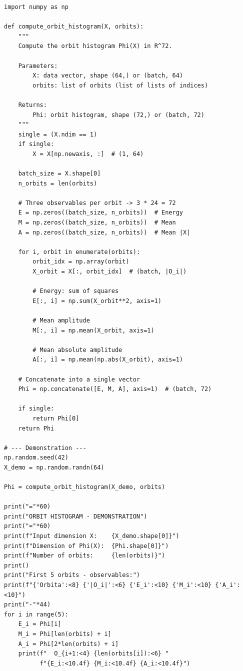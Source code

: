 \documentclass[11pt,a4paper]{report}
\begin{document}
\label{app:ch2-lst2}
\begin{lstlisting}[caption={Implementation of the orbit histogram $\Phi(X)$}]
import numpy as np

def compute_orbit_histogram(X, orbits):
    """
    Compute the orbit histogram Phi(X) in R^72.
    
    Parameters:
        X: data vector, shape (64,) or (batch, 64)
        orbits: list of orbits (list of lists of indices)
    
    Returns:
        Phi: orbit histogram, shape (72,) or (batch, 72)
    """
    single = (X.ndim == 1)
    if single:
        X = X[np.newaxis, :]  # (1, 64)
    
    batch_size = X.shape[0]
    n_orbits = len(orbits)
    
    # Three observables per orbit -> 3 * 24 = 72
    E = np.zeros((batch_size, n_orbits))  # Energy
    M = np.zeros((batch_size, n_orbits))  # Mean
    A = np.zeros((batch_size, n_orbits))  # Mean |X|
    
    for i, orbit in enumerate(orbits):
        orbit_idx = np.array(orbit)
        X_orbit = X[:, orbit_idx]  # (batch, |O_i|)
        
        # Energy: sum of squares
        E[:, i] = np.sum(X_orbit**2, axis=1)
        
        # Mean amplitude
        M[:, i] = np.mean(X_orbit, axis=1)
        
        # Mean absolute amplitude
        A[:, i] = np.mean(np.abs(X_orbit), axis=1)
    
    # Concatenate into a single vector
    Phi = np.concatenate([E, M, A], axis=1)  # (batch, 72)
    
    if single:
        return Phi[0]
    return Phi

# --- Demonstration ---
np.random.seed(42)
X_demo = np.random.randn(64)

Phi = compute_orbit_histogram(X_demo, orbits)

print("="*60)
print("ORBIT HISTOGRAM - DEMONSTRATION")
print("="*60)
print(f"Input dimension X:    {X_demo.shape[0]}")
print(f"Dimension of Phi(X):  {Phi.shape[0]}")
print(f"Number of orbits:     {len(orbits)}")
print()
print("First 5 orbits - observables:")
print(f"{'Orbita':<8} {'|O_i|':<6} {'E_i':<10} {'M_i':<10} {'A_i':<10}")
print("-"*44)
for i in range(5):
    E_i = Phi[i]
    M_i = Phi[len(orbits) + i]
    A_i = Phi[2*len(orbits) + i]
    print(f"  O_{i+1:<4} {len(orbits[i]):<6} "
          f"{E_i:<10.4f} {M_i:<10.4f} {A_i:<10.4f}")
\end{lstlisting}
\end{document}
